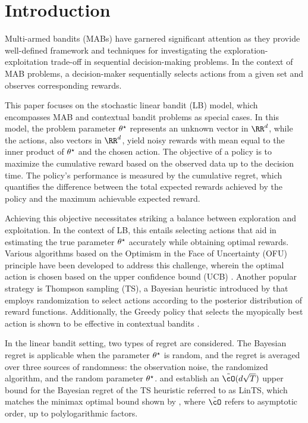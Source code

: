 \section{Introduction}

Multi-armed bandits (MABs) have garnered significant attention as they provide well-defined framework and techniques for investigating the exploration-exploitation trade-off in sequential decision-making problems. In the context of MAB problems, a decision-maker sequentially selects actions from a given set and observes corresponding rewards. 

This paper focuses on the stochastic linear bandit (LB) model, which encompasses MAB and contextual bandit problems as special cases. In this model, the problem parameter $\theta^\star$ represents an unknown vector in $\RR^d$, while the actions, also vectors in $\RR^d$, yield noisy rewards with mean equal to the inner product of $\theta^\star$ and the chosen action. The objective of a policy is to maximize the cumulative reward based on the observed data up to the decision time. The policy's performance is measured by the cumulative regret, which quantifies the difference between the total expected rewards achieved by the policy and the maximum achievable expected reward. 

Achieving this objective necessitates striking a balance between exploration and exploitation. In the context of LB, this entails selecting actions that aid in estimating the true parameter $\theta^\star$ accurately while obtaining optimal rewards. Various algorithms based on the Optimism in the Face of Uncertainty (OFU) principle have been developed to address this challenge, wherein the optimal action is chosen based on the upper confidence bound (UCB) \citep{lai1985asymptotically, auer2002using, dani2008stochastic, rusmevichientong2010linearly}. Another  popular strategy is Thompson sampling (TS), a Bayesian heuristic introduced by \cite{thompson1933likelihood} that employs randomization to select actions according to the posterior distribution of reward functions. Additionally, the Greedy policy that selects the myopically best action is shown to be effective in contextual bandits \citep{kannan2018smoothed,raghavan2018externalities,hao2020adaptive, bastani2021mostly}.

In the linear bandit setting, two types of regret are considered. The Bayesian regret is applicable when the parameter $\theta^\star$ is random, and the regret is averaged over three sources of randomness: the observation noise, the randomized algorithm, and the random parameter $\theta^\star$. \cite{russo2014learning} and \cite{dong2018information} establish an $\tilde{\cO}(d \sqrt{T})$ upper bound for the Bayesian regret of the TS heuristic referred to as LinTS, which matches the minimax optimal bound shown by \cite{dani2008stochastic}, where $\tilde{\cO}$ refers to asymptotic order, up to polylogarithmic factors. 

